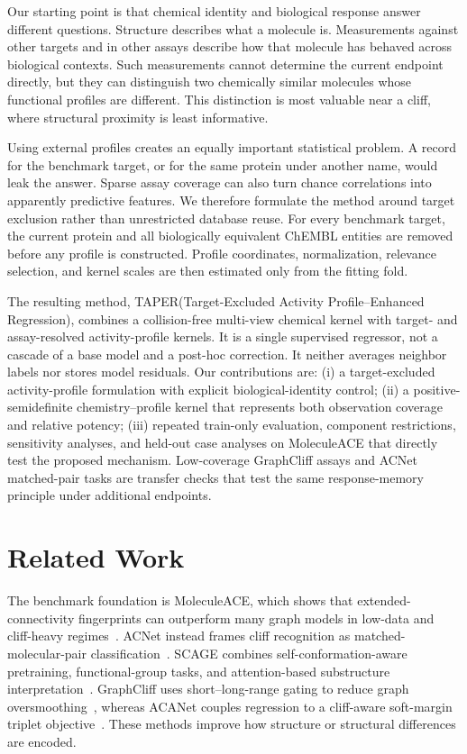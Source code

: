 \documentclass[manuscript,nonacm]{acmart}
\newcommand{\method}{TAPER\xspace}
\newcommand{\mace}{MoleculeACE\xspace}
\begin{document}
Our starting point is that chemical identity and biological response answer
different questions. Structure describes what a molecule is. Measurements
against other targets and in other assays describe how that molecule has
behaved across biological contexts. Such measurements cannot determine the
current endpoint directly, but they can distinguish two chemically similar
molecules whose functional profiles are different. This distinction is most
valuable near a cliff, where structural proximity is least informative.

Using external profiles creates an equally important statistical problem. A
record for the benchmark target, or for the same protein under another name,
would leak the answer. Sparse assay coverage can also turn chance correlations
into apparently predictive features. We therefore formulate the method around
target exclusion rather than unrestricted database reuse. For every benchmark
target, the current protein and all biologically equivalent ChEMBL entities are
removed before any profile is constructed. Profile coordinates,
normalization, relevance selection, and kernel scales are then estimated only
from the fitting fold.

The resulting method, \method (Target-Excluded Activity Profile--Enhanced Regression),
combines a collision-free multi-view chemical kernel with target- and
assay-resolved activity-profile kernels. It is a single supervised regressor,
not a cascade of a base model and a post-hoc correction. It neither averages
neighbor labels nor stores model residuals. Our contributions are: (i) a
target-excluded activity-profile formulation with explicit biological-identity
control; (ii) a positive-semidefinite chemistry--profile kernel that represents
both observation coverage and relative potency; (iii) repeated train-only
evaluation, component restrictions, sensitivity analyses, and held-out case
analyses on \mace that directly test the proposed mechanism. Low-coverage
GraphCliff assays and ACNet matched-pair tasks are transfer checks that test
the same response-memory principle under additional endpoints.

\section{Related Work}
The benchmark foundation is \mace, which shows that extended-connectivity
fingerprints can outperform many graph models in low-data and cliff-heavy
regimes~\cite{moleculeace}. ACNet instead frames cliff recognition as
matched-molecular-pair classification~\cite{acnet}. SCAGE combines
self-conformation-aware pretraining, functional-group tasks, and attention-based
substructure interpretation~\cite{scage}. GraphCliff uses short--long-range
gating to reduce graph oversmoothing~\cite{graphcliff}, whereas ACANet couples
regression to a cliff-aware soft-margin triplet objective~\cite{acanets}. These
methods improve how structure or structural differences are encoded.
\end{document}
